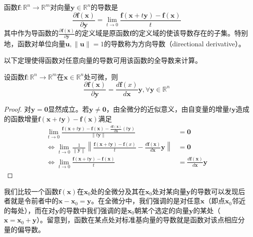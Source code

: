 \documentclass[main.tex]{subfiles}
\begin{document}
\begin{definition}
函数$\mathbf{f}:\mathbb{R}^n\rightarrow\mathbb{R}^m$对向量$\mathbf{y}\in\mathbb{R}^n$的导数是
\[\frac{\partial\mathbf{f}\left(\mathbf{x}\right)}{\partial\mathbf{y}}=\lim_{t\to 0}\frac{\mathbf{f}\left(\mathbf{x}+t\mathbf{y}\right)-\mathbf{f}\left(\mathbf{x}\right)}{t}\]
其中作为导函数的$\frac{\partial \mathbf{f}\left(\mathbf{x}\right)}{\partial\mathbf{y}}$的定义域是原函数$\mathbf{f}$的定义域的使该导数存在的子集。特别地，函数对单位向量$\mathbf{u},\left\|\mathbf{u}\right\|=1$的导数称为方向导数（directional derivative）。
\end{definition}

以下定理使得函数对任意向量的导数可用该函数的全导数来计算。

\begin{theorem}\label{thm:II.12.6}
设函数$\mathbf{f}:\mathbb{R}^n\rightarrow\mathbb{R}^m$在$\mathbf{x}\in\mathbb{R}^n$处可微，则
\[\frac{\partial\mathbf{f}\left(\mathbf{x}\right)}{\partial\mathbf{y}}=\frac{d\mathbf{f}\left(x\right)}{d\mathbf{x}}\mathbf{y},\forall\mathbf{y}\in\mathbb{R}^n\]
\end{theorem}
\begin{proof}
对$\mathbf{y}=\mathbf{0}$显然成立。若$\mathbf{y}\neq\mathbf{0}$，由全微分的近似意义，由自变量的增量$t\mathbf{y}$造成的函数增量$\mathbf{f}\left(\mathbf{x}+t\mathbf{y}\right)-\mathbf{f}\left(\mathbf{x}\right)$满足
\begin{align*}
\lim_{t\to 0}\frac{\mathbf{f}\left(\mathbf{x}+t\mathbf{y}\right)-\mathbf{f}\left(\mathbf{x}\right)-\frac{d\mathbf{f}\left(\mathbf{x}\right)}{d\mathbf{x}}\left(t\mathbf{y}\right)}{\left\|t\mathbf{y}\right\|}&=\mathbf{0}\\
\Leftrightarrow\lim_{t\to 0}\frac{1}{\left\|\mathbf{y}\right\|}\left\|\frac{\mathbf{f}\left(\mathbf{x}+t\mathbf{y}\right)-\mathbf{f}\left(x\right)}{t}-\frac{d\mathbf{f}\left(\mathbf{x}\right)}{d\mathbf{x}}\mathbf{y}\right\|&=\mathbf{0}\\
\Leftrightarrow\lim_{t\to 0}\frac{\mathbf{f}\left(\mathbf{x}+t\mathbf{y}\right)-\mathbf{f}\left(\mathbf{x}\right)}{t}&=\frac{d\mathbf{f}\left(\mathbf{x}\right)}{d\mathbf{x}}\mathbf{y}
\end{align*}
\end{proof}

我们比较一个函数$\mathbf{f}\left(\mathbf{x}\right)$在$\mathbf{x}_0$处的全微分及其在$\mathbf{x}_0$处对某向量$\mathbf{y}$的导数可以发现后者就是令前者中的$\mathbf{x}-\mathbf{x}_0=\mathbf{y}$。在全微分中，我们强调的是对任意$\mathbf{x}$（即点$\mathbf{x}_0$邻近的每处），而在对$\mathbf{y}$的导数中我们强调的是$\mathbf{x}_0$朝某个选定的向量$\mathbf{y}$的某处（$\mathbf{x}=\mathbf{x}_0+\mathbf{y}$）。留意到，函数在某点处对标准基向量的导数就是函数对该点相应分量的偏导数。
\end{document}
